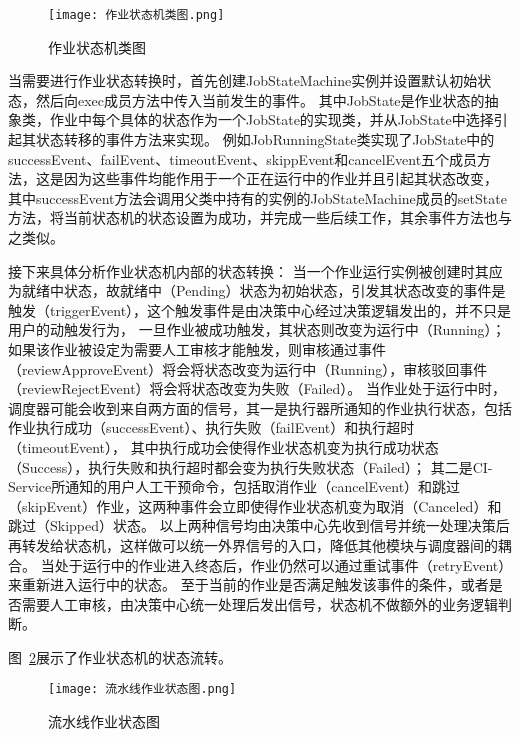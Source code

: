 \begin{figure}[h]
  \centering
  \texttt{[image: 作业状态机类图.png]}
  \caption{作业状态机类图}
  \label{fig:作业状态机类图}
\end{figure}

当需要进行作业状态转换时，首先创建JobStateMachine实例并设置默认初始状态，然后向exec成员方法中传入当前发生的事件。
其中JobState是作业状态的抽象类，作业中每个具体的状态作为一个JobState的实现类，并从JobState中选择引起其状态转移的事件方法来实现。
例如JobRunningState类实现了JobState中的successEvent、failEvent、timeoutEvent、skippEvent和cancelEvent五个成员方法，这是因为这些事件均能作用于一个正在运行中的作业并且引起其状态改变，
其中successEvent方法会调用父类中持有的实例的JobStateMachine成员的setState方法，将当前状态机的状态设置为成功，并完成一些后续工作，其余事件方法也与之类似。

接下来具体分析作业状态机内部的状态转换：
当一个作业运行实例被创建时其应为就绪中状态，故就绪中（Pending）状态为初始状态，引发其状态改变的事件是触发（triggerEvent），这个触发事件是由决策中心经过决策逻辑发出的，并不只是用户的动触发行为，
一旦作业被成功触发，其状态则改变为运行中（Running）；如果该作业被设定为需要人工审核才能触发，则审核通过事件（reviewApproveEvent）将会将状态改变为运行中（Running），审核驳回事件（reviewRejectEvent）将会将状态改变为失败（Failed）。
当作业处于运行中时，调度器可能会收到来自两方面的信号，其一是执行器所通知的作业执行状态，包括作业执行成功（successEvent）、执行失败（failEvent）和执行超时（timeoutEvent），
其中执行成功会使得作业状态机变为执行成功状态（Success），执行失败和执行超时都会变为执行失败状态（Failed）；
其二是CI-Service所通知的用户人工干预命令，包括取消作业（cancelEvent）和跳过（skipEvent）作业，这两种事件会立即使得作业状态机变为取消（Canceled）和跳过（Skipped）状态。
以上两种信号均由决策中心先收到信号并统一处理决策后再转发给状态机，这样做可以统一外界信号的入口，降低其他模块与调度器间的耦合。
当处于运行中的作业进入终态后，作业仍然可以通过重试事件（retryEvent）来重新进入运行中的状态。
至于当前的作业是否满足触发该事件的条件，或者是否需要人工审核，由决策中心统一处理后发出信号，状态机不做额外的业务逻辑判断。

图~\ref{fig:流水线作业状态图}展示了作业状态机的状态流转。

\begin{figure}[h]
  \centering
  \texttt{[image: 流水线作业状态图.png]}
  \caption{流水线作业状态图}
  \label{fig:流水线作业状态图}
\end{figure}


